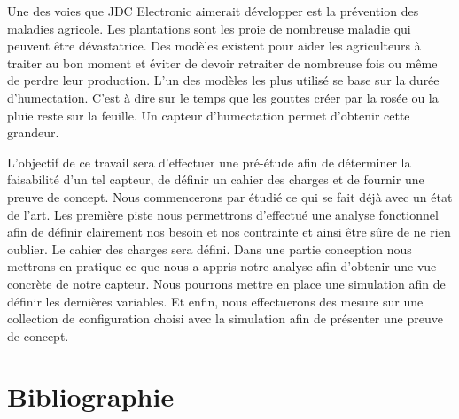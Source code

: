 \documentclass[a4paper, french, 10pt]{article} %
\begin{document}
Une des voies que JDC Electronic aimerait développer est la prévention des maladies agricole. Les plantations sont les proie de nombreuse maladie qui peuvent être dévastatrice. Des modèles existent pour aider les agriculteurs à traiter au bon moment et éviter de devoir retraiter de nombreuse fois ou même de perdre leur production. L'un des modèles les plus utilisé \cite{doi:10.1094/PDIS-05-14-0529-FE}  se base sur la durée d'humectation. C'est à dire sur le temps que les gouttes créer par la rosée ou la pluie reste sur la feuille. Un capteur d'humectation permet d'obtenir cette grandeur.

L'objectif de ce travail sera d'effectuer une pré-étude afin de déterminer la faisabilité d'un tel capteur, de définir un cahier des charges et de fournir une preuve de concept. Nous commencerons par étudié ce qui se fait déjà avec un état de l'art. Les première piste  nous permettrons d'effectué une analyse fonctionnel afin de définir clairement nos besoin et nos contrainte et ainsi être sûre de ne rien oublier. Le cahier des charges sera défini. Dans une partie conception nous mettrons en pratique ce que nous a appris notre analyse afin d'obtenir une vue concrète de notre capteur. Nous pourrons mettre en place une simulation afin de définir les dernières variables. Et enfin, nous effectuerons des mesure sur une collection de configuration choisi avec la simulation afin de présenter une preuve de concept.










\section{Bibliographie}

\printbibliography
\end{document}
